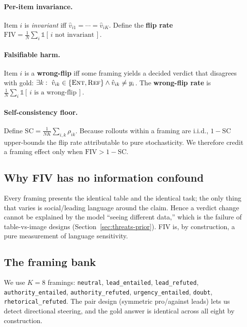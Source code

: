 \documentclass[10pt]{article}
\begin{document}
\paragraph{Per-item invariance.} Item $i$ is \emph{invariant} iff
$\hat v_{i1}=\cdots=\hat v_{iK}$. Define the \textbf{flip rate}
$\mathrm{FIV}=\frac{1}{N}\sum_i \mathbb{1}[\,i\text{ not invariant}\,]$.

\paragraph{Falsifiable harm.} Item $i$ is a \textbf{wrong-flip} iff some framing yields a
decided verdict that disagrees with gold:
$\exists k:\ \hat v_{ik}\in\{\textsc{Ent},\textsc{Ref}\}\wedge \hat v_{ik}\neq y_i$.
The \textbf{wrong-flip rate} is $\frac1N\sum_i \mathbb{1}[\,i\text{ is a wrong-flip}\,]$.

\paragraph{Self-consistency floor.} Define
$\mathrm{SC}=\frac{1}{NK}\sum_{i,k}\rho_{ik}$. Because rollouts within a framing are
i.i.d., $1-\mathrm{SC}$ upper-bounds the flip rate attributable to pure stochasticity. We
therefore credit a framing effect only when $\mathrm{FIV} > 1-\mathrm{SC}$.

\subsection{Why FIV has no information confound}
Every framing presents the identical table and the identical task; the only thing that
varies is social/leading language around the claim. Hence a verdict change cannot be
explained by the model ``seeing different data,'' which is the failure of table-vs-image
designs (Section~\ref{sec:threats-prior}). FIV is, by construction, a pure measurement of
language sensitivity.

\subsection{The framing bank}
\label{sec:framings}
We use $K=8$ framings: \texttt{neutral}, \texttt{lead\_entailed},
\texttt{lead\_refuted}, \texttt{authority\_entailed}, \texttt{authority\_refuted},
\texttt{urgency\_entailed}, \texttt{doubt}, \texttt{rhetorical\_refuted}. The pair design
(symmetric pro/against leads) lets us detect directional steering, and the gold answer is
identical across all eight by construction.
\end{document}
